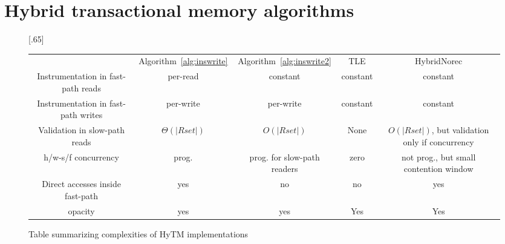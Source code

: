\section{Hybrid transactional memory algorithms}\label{sec:hytmalgos}
%

%
%
\begin{figure*}[!t]
      
     \scalebox{.65}[.65]{
     \begin{tabularx}{\textwidth}{c|c|c|c|c}
	~~~~~ & Algorithm~\ref{alg:inswrite} & Algorithm~\ref{alg:inswrite2} & TLE & HybridNorec\\ 
	Instrumentation in fast-path reads & per-read & constant & constant & constant \\ 
	Instrumentation in fast-path writes & per-write & per-write & constant & constant \\ 
	Validation in slow-path reads & $\Theta(|Rset|)$ & $O(|Rset|)$ & None & $O(|Rset|)$, but validation only if concurrency \\ 
	h/w-s/f concurrency & prog. & prog. for slow-path readers & zero & not prog., but small contention window \\ 
	Direct accesses inside fast-path & yes & no & no & yes \\ 
	opacity & yes & yes & Yes & Yes 
   \end{tabularx}
\caption{Table summarizing complexities of HyTM implementations}\label{fig:main}    
}
\end{figure*}
